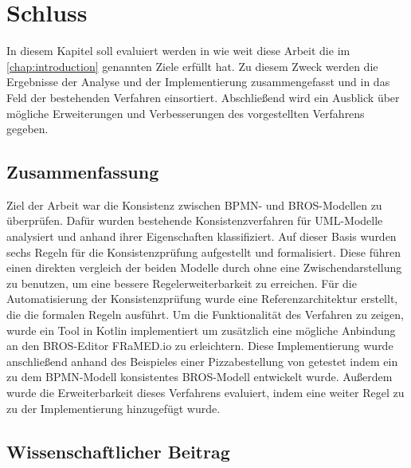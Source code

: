\chapter{Schluss}
\label{chap:conclusion}

In diesem Kapitel soll evaluiert werden in wie weit diese Arbeit die im \cref{chap:introduction} genannten Ziele erfüllt hat.
Zu diesem Zweck werden die Ergebnisse der Analyse und der Implementierung zusammengefasst und in das Feld der bestehenden Verfahren einsortiert.
Abschließend wird ein Ausblick über mögliche Erweiterungen und Verbesserungen des vorgestellten Verfahrens gegeben.

\section{Zusammenfassung}

Ziel der Arbeit war die Konsistenz zwischen BPMN- und BROS-Modellen zu überprüfen.
Dafür wurden bestehende Konsistenzverfahren für UML-Modelle analysiert und anhand ihrer Eigenschaften klassifiziert.
Auf dieser Basis wurden sechs Regeln für die Konsistenzprüfung aufgestellt und formalisiert.
Diese führen einen direkten vergleich der beiden Modelle durch ohne eine Zwischendarstellung zu benutzen, um eine bessere Regelerweiterbarkeit zu erreichen.
Für die Automatisierung der Konsistenzprüfung wurde eine Referenzarchitektur erstellt, die die formalen Regeln ausführt.
Um die Funktionalität des Verfahren zu zeigen, wurde ein Tool in Kotlin implementiert um zusätzlich eine mögliche Anbindung an den BROS-Editor FRaMED.io zu erleichtern.
Diese Implementierung wurde anschließend anhand des Beispieles einer Pizzabestellung von \cite{Schoen} getestet indem ein zu dem BPMN-Modell konsistentes BROS-Modell entwickelt wurde.
Außerdem wurde die Erweiterbarkeit dieses Verfahrens evaluiert, indem eine weiter Regel zu zu der Implementierung hinzugefügt wurde.

\section{Wissenschaftlicher Beitrag}

